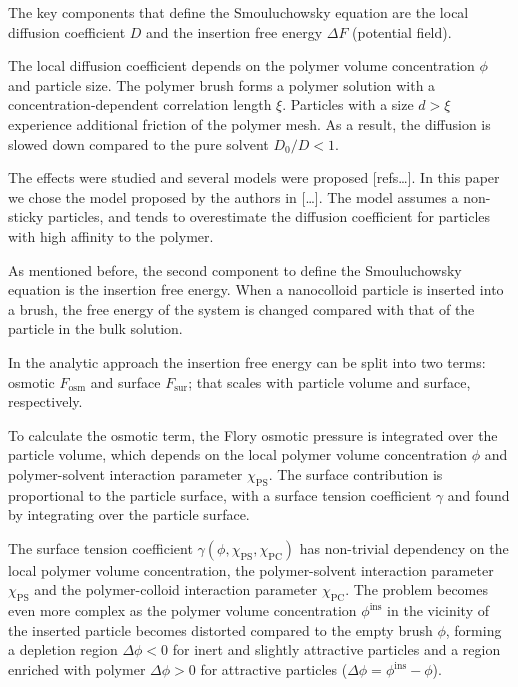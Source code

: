 \documentclass[10pt, a4paper]{article}
\begin{document}
\begin{multicols}{2}
The key components that define the Smouluchowsky equation are the local diffusion coefficient $D$ and the insertion free energy $\Delta F$ (potential field). 


The local diffusion coefficient depends on the polymer volume concentration $\phi$ and particle size. 
The polymer brush forms a polymer solution with a concentration-dependent correlation length $\xi$. 
Particles with a size $d>\xi$ experience additional friction of the polymer mesh. 
As a result, the diffusion is slowed down compared to the pure solvent $D_0/D<1$.

The effects were studied and several models were proposed [refs\dots]. 
In this paper we chose the model proposed by the authors in [\dots].
The model assumes a non-sticky particles, and tends to overestimate the diffusion coefficient for particles with high affinity to the polymer.

As mentioned before, the second component to define the Smouluchowsky equation is the insertion free energy. 
When a nanocolloid particle is inserted into a brush, the free energy of the system is changed compared with that of the particle in the bulk solution. 

In the analytic approach the insertion free energy can be split into two terms: osmotic $F_{\textrm{osm}}$ and surface $F_{\textrm{sur}}$; that scales with particle volume and surface, respectively.

To calculate the osmotic term, the Flory osmotic pressure is integrated over the particle volume, which depends on the local polymer volume concentration $\phi$ and polymer-solvent interaction parameter $\chi_{\textrm{PS}}$.
The surface contribution is proportional to the particle surface, with a surface tension coefficient $\gamma$ and found by integrating over the particle surface.

The surface tension coefficient $\gamma(\phi, \chi_{\textrm{PS}}, \chi_{\textrm{PC}})$ has non-trivial dependency on the local polymer volume concentration, the polymer-solvent interaction parameter $\chi_{\textrm{PS}}$ and the polymer-colloid interaction parameter $\chi_{\textrm{PC}}$.
The problem becomes even more complex as the polymer volume concentration $\phi^{\textrm{ins}}$ in the vicinity of the inserted particle becomes distorted compared to the empty brush $\phi$, forming a depletion region $\Delta \phi <0$ for inert and slightly attractive particles and a region enriched with polymer $\Delta \phi >0$ for attractive particles ($\Delta \phi = \phi^{\textrm{ins}} - \phi$).


\end{multicols}
\end{document}
